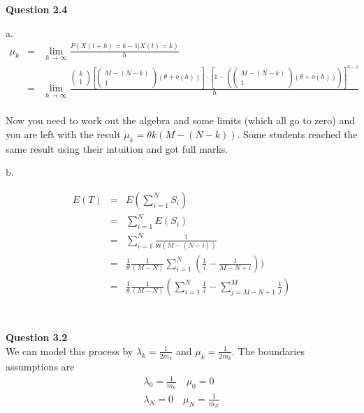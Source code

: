 \documentclass[10pt,a4paper]{article}
\begin{document}
\begin{flushleft}

\begin{eqnarray*}
\\
\end{eqnarray*}


\textbf{Question 2.4}

a.
\begin{eqnarray*}
\mu_k&=& \lim_{h \rightarrow \infty} \frac{P(X(t+h)=k-1|X(t)=k)}{h}\\
&=& \lim_{h \rightarrow \infty}\frac{ \left ( \begin{array}{c}
k\\
 1 \end{array} \right ) \left [ \left ( \begin{array}{c}
M-(N-k)\\
 1 \end{array} \right ) (\theta + o(h)) \right ] \cdot \left [ 1-\left(\left ( \begin{array}{c}
M-(N-k)\\
 1 \end{array} \right ) (\theta + o(h))\right) \right
 ]^{k-1}}{h}\\
\end{eqnarray*}

Now you need to work out the algebra and some limits (which all go
to zero) and you are left with the result $\mu_k=\theta k
(M-(N-k))$. Some students reached the same result using their
intuition and got full marks.

b.

\begin{eqnarray*}
E(T)&=& E(\sum_{i=1}^N S_i) \\
&=& \sum_{i=1}^N E(S_i) \\
&=& \sum_{i=1}^N \frac{1}{\theta i(M-(N-i))} \\
&=& \frac{1}{\theta} \frac{1}{(M-N)} \sum_{i=1}^{N} (\frac{1}{i}
-\frac{1}{M-N+i}))\\
&=& \frac{1}{\theta} \frac{1}{(M-N)} (\sum_{i=1}^{N} \frac{1}{i}
- \sum_{j=M-N+1}^{M} \frac{1}{j})\\
\end{eqnarray*}

\begin{eqnarray*}
\\
\end{eqnarray*}



\textbf{Question 3.2}\\
We can model this process by $\lambda_k=\frac{1}{2m_k}$ and
$\mu_k=\frac{1}{2m_k}$. The boundaries assumptions are
\begin{eqnarray*}
\lambda_0=\frac{1}{m_0} \quad \mu_0=0\\
\lambda_N=0 \quad \mu_N=\frac{1}{m_N}\\
\end{eqnarray*}


\end{flushleft}
\end{document}

